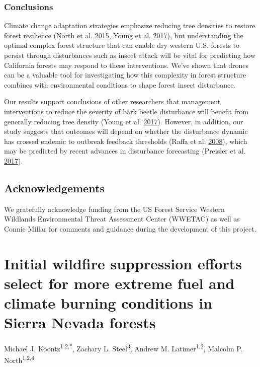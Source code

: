 \documentclass[twoside,12pt,final]{ucthesis-CA2012}
\begin{document}
\begin{ucmainmatter}
\subsection{Conclusions}\label{conclusions-1}

Climate change adaptation strategies emphasize reducing tree densities
to restore forest resilience (North et al.
\protect\hyperlink{ref-north2015}{2015}, Young et al.
\protect\hyperlink{ref-young2017}{2017}), but understanding the optimal
complex forest structure that can enable dry western U.S. forests to
persist through disturbances such as insect attack will be vital for
predicting how California forests may respond to these interventions.
We've shown that drones can be a valuable tool for investigating how
this complexity in forest structure combines with environmental
conditions to shape forest insect disturbance.

Our results support conclusions of other researchers that management
interventions to reduce the severity of bark beetle disturbance will
benefit from generally reducing tree density (Young et al.
\protect\hyperlink{ref-young2017}{2017}). However, in addition, our
study suggests that outcomes will depend on whether the disturbance
dynamic has crossed endemic to outbreak feedback thresholds (Raffa et
al. \protect\hyperlink{ref-raffa2008}{2008}), which may be predicted by
recent advances in disturbance forecasting (Preisler et al.
\protect\hyperlink{ref-preisler2017}{2017}).

\section{Acknowledgements}\label{acknowledgements-1}

We gratefully acknowledge funding from the US Forest Service Western
Wildlands Environmental Threat Assessment Center (WWETAC) as well as
Connie Millar for comments and guidance during the development of this
project.

\chapter{Initial wildfire suppression efforts select for more extreme
fuel and climate burning conditions in Sierra Nevada
forests}\label{initial-wildfire-suppression-efforts-select-for-more-extreme-fuel-and-climate-burning-conditions-in-sierra-nevada-forests}

Michael J. Koontz\textsuperscript{1,2,*}, Zachary L.
Steel\textsuperscript{3}, Andrew M. Latimer\textsuperscript{1,2},
Malcolm P. North\textsuperscript{1,2,4}


\end{ucmainmatter}
\end{document}

